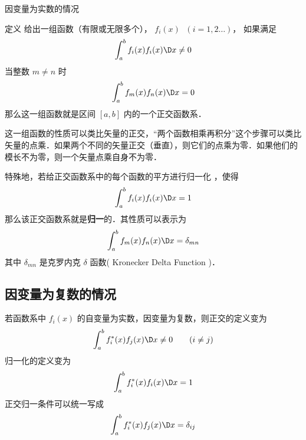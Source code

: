 因变量为实数的情况

定义
给出一组函数（有限或无限多个）， ${f_i}(x)\;$ $( {i = 1,2\dots} )$，  如果满足
\begin{equation}
\int_a^b {{f_i}(x)} {f_i}(x)\D x \ne 0
\end{equation} 
当整数 $m \ne n$ 时
\begin{equation}
\int_a^b {{f_m}(x)} {f_n}(x)\D x = 0
\end{equation} 
那么这一组函数就是区间 $[a,b]$ 内的一个正交函数系．

这一组函数的性质可以类比矢量的正交，“两个函数相乘再积分”这个步骤可以类比矢量的点乘．如果两个不同的矢量正交（垂直），则它们的点乘为零．如果他们的模长不为零，则一个矢量点乘自身不为零．

特殊地，若给正交函数系中的每个函数的平方进行归一化%
，使得
\begin{equation}
\int_a^b {{f_i}(x)} {f_i}(x)\D x = 1
\end{equation} 
那么该正交函数系就是\textbf{归一}的．其性质可以表示为
 \begin{equation}
\int_a^b {{f_m}(x)} {f_n}(x)\D x = {\delta _{mn}}
\end{equation} 
其中 ${\delta _{mn}}$ 是克罗内克 $\delta$ 函数( Kronecker Delta Function )．


\subsection{因变量为复数的情况}

若函数系中 ${f_i}(x)$ 的自变量为实数，因变量为复数，则正交的定义变为
 \begin{equation}
\int_a^b {f_i^*(x)} {f_j}(x)\D x \ne 0 \qquad ( {i \ne j} )
\end{equation}    
归一化的定义变为
 \begin{equation}
\int_a^b {f_i^*(x)} {f_i}(x)\D x = 1
\end{equation} 
正交归一条件可以统一写成
 \begin{equation}
\int_a^b {f_i^*(x)} {f_j}(x)\D x = {\delta _{ij}}
\end{equation}
